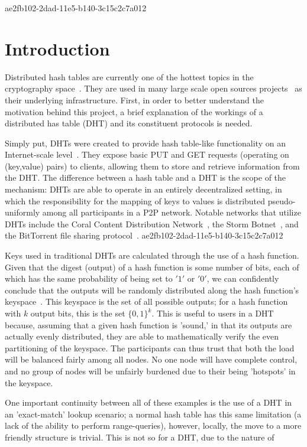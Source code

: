 \documentclass[12pt]{article}
\begin{document}
ae2fb102-2dad-11e5-b140-3c15c2c7a012\section{Introduction}
\par Distributed hash tables are currently one of the hottest topics in the cryptography space~\cite{Stoica:2001dj,Rowstron:2001ea,Ratnasamy:2001wn}. They are used in many large scale open sources projects~\cite{Freitas:2013tb,Xu:2010vs,Perfitt:2010fh} as their underlying infrastructure. First, in order to better understand the motivation behind this project, a brief explanation of the workings of a distributed has table (DHT) and its constituent protocols is needed.

\par Simply put, DHTs were created to provide hash table-like functionality on an Internet-scale level~\cite{Ratnasamy:2001wn}. They expose basic PUT and GET requests (operating on (key,value) pairs) to clients, allowing them to store and retrieve information from the DHT. The difference between a hash table and a DHT is the scope of the mechanism: DHTs are able to operate in an entirely decentralized setting, in which the responsibility for the mapping of keys to values is distributed pseudo-uniformly among all participants in a P2P network. Notable networks that utilize DHTs include the Coral Content Distribution Network~\cite{Freedman:2004vb}, the Storm Botnet~\cite{Holz:2008uk}, and the BitTorrent file sharing protocol~\cite{Cohen:y1_8mBnw}.
ae2fb102-2dad-11e5-b140-3c15c2c7a012
\par Keys used in traditional DHTs are calculated through the use of a hash function. Given that the digest (output) of a hash function is some number of bits, each of which has the same probability of being set to $'1'$ or $'0'$, we can confidently conclude that the outputs will be randomly distributed along the hash function's keyspace~. This keyspace is the set of all possible outputs; for a hash function with $k$ output bits, this is the set $\{0,1\}^k$. This is useful to users in a DHT because, assuming that a given hash function is 'sound,' in that its outputs are actually evenly distributed, they are able to mathematically verify the even partitioning of the keyspace. The participants can thus trust that both the load will be balanced fairly among all nodes. No one node will have complete control, and no group of nodes will be unfairly burdened due to their being 'hotspots' in the keyspace.~

\par One important continuity between all of these examples is the use of a DHT in an 'exact-match' lookup scenario; a normal hash table has this same limitation (a lack of the ability to perform range-queries), however, locally, the move to a more friendly structure is trivial. This is not so for a DHT, due to the nature of
\printbibliography
\end{document}
